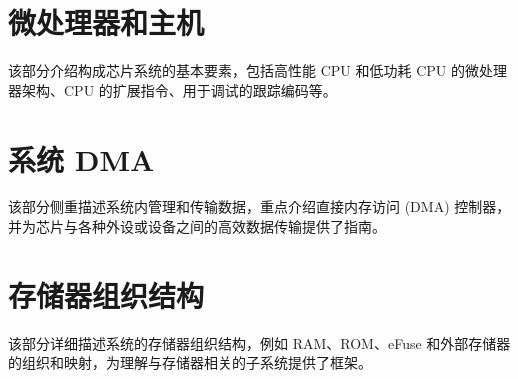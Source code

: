 \documentclass[openany, 10pt]{book}
\begin{document}
\setchineseformatting




\clearpage

\clearpage


\tableofcontents
\clearpage
\listoftables
\clearpage
\listoffigures





\part{微处理器和主机}


该部分介绍构成芯片系统的基本要素，包括高性能 CPU 和低功耗 CPU 的微处理器架构、CPU 的扩展指令、用于调试的跟踪编码等。


\part{系统 DMA}


该部分侧重描述系统内管理和传输数据，重点介绍直接内存访问 (DMA) 控制器，并为芯片与各种外设或设备之间的高效数据传输提供了指南。


\part{存储器组织结构}

该部分详细描述系统的存储器组织结构，例如 RAM、ROM、eFuse 和外部存储器的组织和映射，为理解与存储器相关的子系统提供了框架。
\end{document}
